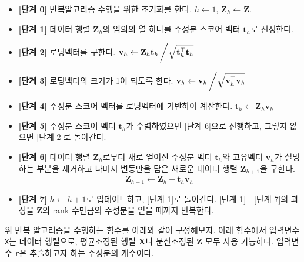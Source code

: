 \documentclass[
]{book}
\providecommand{\tightlist}{%
  \setlength{\itemsep}{0pt}\setlength{\parskip}{0pt}}
\begin{document}
\begin{itemize}
\tightlist
\item
  \textbf{{[}단계 0{]}} 반복알고리즘 수행을 위한 초기화를 한다. \(h \leftarrow 1\), \(\mathbf{Z}_h \leftarrow \mathbf{Z}\).
\item
  \textbf{{[}단계 1{]}} 데이터 행렬 \(\mathbf{Z}_h\)의 임의의 열 하나를 주성분 스코어 벡터 \(\mathbf{t}_h\)로 선정한다.
\item
  \textbf{{[}단계 2{]}} 로딩벡터를 구한다. \(\mathbf{v}_h \leftarrow \mathbf{Z}_h \mathbf{t}_h \left/ \sqrt{\mathbf{t}_h^\top \mathbf{t}_h} \right.\)
\item
  \textbf{{[}단계 3{]}} 로딩벡터의 크기가 1이 되도록 한다. \(\mathbf{v}_h \leftarrow \mathbf{v}_h \left/ \sqrt{\mathbf{v}_h^\top \mathbf{v}_h} \right.\)
\item
  \textbf{{[}단계 4{]}} 주성분 스코어 벡터를 로딩벡터에 기반하여 계산한다. \(\mathbf{t}_h \leftarrow \mathbf{Z}_h \mathbf{v}_h\)
\item
  \textbf{{[}단계 5{]}} 주성분 스코어 벡터 \(\mathbf{t}_h\)가 수렴하였으면 {[}단계 6{]}으로 진행하고, 그렇지 않으면 {[}단계 2{]}로 돌아간다.
\item
  \textbf{{[}단계 6{]}} 데이터 행렬 \(\mathbf{Z}_h\)로부터 새로 얻어진 주성분 벡터 \(\mathbf{t}_h\)와 고유벡터 \(\mathbf{v}_h\)가 설명하는 부분을 제거하고 나머지 변동만을 담은 새로운 데이터 행렬 \(\mathbf{Z}_{h + 1}\)을 구한다.
  \[ \mathbf{Z}_{h + 1} \leftarrow \mathbf{Z}_{h} - \mathbf{t}_h \mathbf{v}_h^\top \]
\item
  \textbf{{[}단계 7{]}} \(h \leftarrow h + 1\)로 업데이트하고, {[}단계 1{]}로 돌아간다. {[}단계 1{]} - {[}단계 7{]}의 과정을 \(\mathbf{Z}\)의 rank 수만큼의 주성분을 얻을 때까지 반복한다.
\end{itemize}

위 반복 알고리즘을 수행하는 함수를 아래와 같이 구성해보자. 아래 함수에서 입력변수 \texttt{X}는 데이터 행렬으로, 평균조정된 행렬 \(\mathbf{X}\)나 분산조정된 \(\mathbf{Z}\) 모두 사용 가능하다. 입력변수 \texttt{r}은 추출하고자 하는 주성분의 개수이다.
\end{document}
